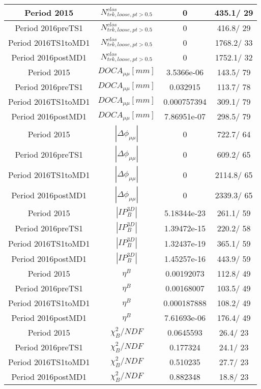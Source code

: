 \documentclass{article}
\begin{document}
\begin{longtable}{c|c|c|c}
\hline
 Period 2015 & $N^{clos}_{trk, loose, pt>0.5}$ & 0 & 435.1/ 29\\
\hline
 Period 2016preTS1 & $N^{clos}_{trk, loose, pt>0.5}$ & 0 & 416.8/ 29\\
\hline
 Period 2016TS1toMD1 & $N^{clos}_{trk, loose, pt>0.5}$ & 0 & 1768.2/ 33\\
\hline
 Period 2016postMD1 & $N^{clos}_{trk, loose, pt>0.5}$ & 0 & 1752.1/ 32\\
\hline
 Period 2015 & $DOCA_{\mu\mu} [mm]$ & 3.5366e-06 & 143.5/ 79\\
\hline
 Period 2016preTS1 & $DOCA_{\mu\mu} [mm]$ & 0.032915 & 113.7/ 78\\
\hline
 Period 2016TS1toMD1 & $DOCA_{\mu\mu} [mm]$ & 0.000757394 & 309.1/ 79\\
\hline
 Period 2016postMD1 & $DOCA_{\mu\mu} [mm]$ & 7.86951e-07 & 298.5/ 79\\
\hline
 Period 2015 & $|\Delta\phi_{\mu\mu}|$ & 0 & 722.7/ 64\\
\hline
 Period 2016preTS1 & $|\Delta\phi_{\mu\mu}|$ & 0 & 609.2/ 65\\
\hline
 Period 2016TS1toMD1 & $|\Delta\phi_{\mu\mu}|$ & 0 & 2114.8/ 65\\
\hline
 Period 2016postMD1 & $|\Delta\phi_{\mu\mu}|$ & 0 & 2339.3/ 65\\
\hline
 Period 2015 & $|IP_{B}^{3D}|$ & 5.18344e-23 & 261.1/ 59\\
\hline
 Period 2016preTS1 & $|IP_{B}^{3D}|$ & 1.39472e-15 & 220.2/ 58\\
\hline
 Period 2016TS1toMD1 & $|IP_{B}^{3D}|$ & 1.32437e-19 & 365.1/ 59\\
\hline
 Period 2016postMD1 & $|IP_{B}^{3D}|$ & 1.45257e-16 & 443.9/ 59\\
\hline
 Period 2015 & $\eta^{B}$ & 0.00192073 & 112.8/ 49\\
\hline
 Period 2016preTS1 & $\eta^{B}$ & 0.00168007 & 103.5/ 49\\
\hline
 Period 2016TS1toMD1 & $\eta^{B}$ & 0.000187888 & 108.2/ 49\\
\hline
 Period 2016postMD1 & $\eta^{B}$ & 7.61693e-06 & 176.4/ 49\\
\hline
 Period 2015 & $\chi^{2}_{B}/NDF$ & 0.0645593 &  26.4/ 23\\
\hline
 Period 2016preTS1 & $\chi^{2}_{B}/NDF$ & 0.177324 &  24.1/ 23\\
\hline
 Period 2016TS1toMD1 & $\chi^{2}_{B}/NDF$ & 0.510235 &  27.7/ 23\\
\hline
 Period 2016postMD1 & $\chi^{2}_{B}/NDF$ & 0.882348 &  18.8/ 23\\

\end{longtable}
\end{document}
